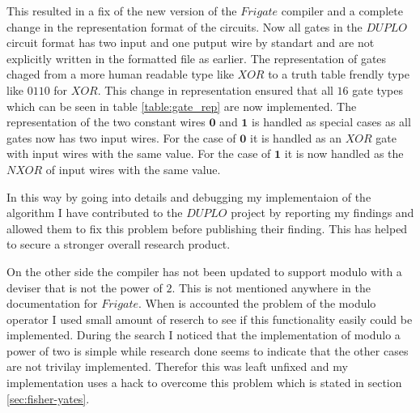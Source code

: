 \documentclass[twoside,11pt,openright]{report}
\begin{document}
\begin{table}
\label{table:gate_rep}
\centering
{}
\caption{A table of the 16 different gate types that can be used in a circuit of the type used in duplo}
\end{table}


This resulted in a fix of the new version of the $Frigate$ compiler and a complete change in the representation format of the circuits. Now all gates in the $DUPLO$ circuit format has two input and one putput wire by standart and are not explicitly written in the formatted file as earlier. The representation of gates chaged from a more human readable type like $XOR$ to a truth table frendly type like $0110$ for $XOR$. This change in representation ensured that all $16$ gate types which can be seen in table \ref{table:gate_rep} are now implemented. The representation of the two constant wires $\textbf{0}$ and $\textbf{1}$ is handled as special cases as all gates now has two input wires. For the case of $\textbf{0}$ it is handled as an $XOR$ gate with input wires with the same value. For the case of $\textbf{1}$ it is now handled as the $NXOR$ of input wires with the same value.

In this way by going into details and debugging my implementaion of the algorithm I have contributed to the $DUPLO$ project by reporting my findings and allowed them to fix this problem before publishing their finding. This has helped to secure a stronger overall research product.

On the other side the compiler has not been updated to support modulo with a deviser that is not the power of $2$. This is not mentioned anywhere in the documentation for $Frigate$. When is accounted the problem of the modulo operator I used small amount of reserch to see if this functionality easily could be implemented. During the search I noticed that the implementation of modulo a power of two is simple while research done seems to indicate that the other cases are not trivilay implemented. Therefor this was leaft unfixed and my implementation uses a hack to overcome this problem which is stated in section \ref{sec:fisher-yates}.
\end{document}
